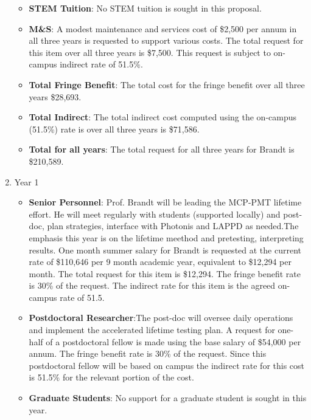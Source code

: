 \begin{enumerate}
\begin{itemize}[noitemsep,nolistsep]
\item {{\bf STEM Tuition}: No STEM tuition is sought in this proposal.}

\item {{\bf M\&S}: A modest maintenance and services cost of \$2,500 per annum in all three years is requested to support various costs. The total request for this item over all three years is \$7,500.  This request is subject to on-campus indirect rate of 51.5\%.}

\item {{\bf Total Fringe Benefit}: The total cost for the fringe benefit over all three years \$28,693.}

\item {{\bf Total Indirect}: The total indirect cost computed using the on-campus (51.5\%) rate is over all three years is \$71,586.}

\item {{\bf Total for all years}: The total request for all three years for Brandt is \$210,589.}

\end{itemize}

\item{Year 1}
\begin{itemize}[noitemsep,nolistsep]
\item{{\bf Senior Personnel}: Prof. Brandt will be leading the MCP-PMT lifetime effort. He will meet regularly with students (supported locally) and post-doc, plan strategies, interface with Photonis  and LAPPD as needed.The emphasis this year is on the lifetime meethod and pretesting, interpreting results.  One month summer salary for Brandt is requested at the current rate of \$110,646 per 9 month academic year, equivalent to \$12,294 per month.  The total request for this item is \$12,294. The fringe benefit rate is 30\% of the request.  The indirect rate for this item is the agreed on-campus rate of 51.5.}

\item {{\bf Postdoctoral Researcher}:The post-doc will oversee daily operations and implement the accelerated lifetime testing plan. A request for one-half of a postdoctoral fellow is made using the base salary of \$54,000 per annum.  The fringe benefit rate is 30\% of the request.  Since this postdoctoral fellow will be based on campus the indirect rate for this cost is 51.5\% for the relevant portion of the cost. } 

\item{{\bf Graduate Students}: No support for a graduate student is sought in this year. }


\end{itemize}
\end{enumerate}
